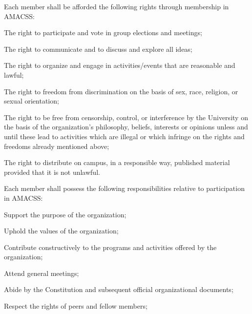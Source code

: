 \documentclass[12pt,a4paper]{article}
\begin{document}
\begin{constitutionlist}
\item Each member shall be afforded the following rights through membership in AMACSS:

\begin{constitutionlist}
\item The right to participate and vote in group elections and meetings;

\item The right to communicate and to discuss and explore all ideas;

\item The right to organize and engage in activities/events that are reasonable and lawful;

\item The right to freedom from discrimination on the basis of sex, race, religion, or sexual orientation;

\item The right to be free from censorship, control, or interference by the University on the basis of the organization's philosophy, beliefs, interests or opinions unless and until these lead to activities which are illegal or which infringe on the rights and freedoms already mentioned above;

\item The right to distribute on campus, in a responsible way, published material provided that it is not unlawful.
\end{constitutionlist}

\item Each member shall possess the following responsibilities relative to participation in AMACSS:

\begin{constitutionlist}
\item Support the purpose of the organization;

\item Uphold the values of the organization;

\item Contribute constructively to the programs and activities offered by the organization;

\item Attend general meetings;

\item Abide by the Constitution and subsequent official organizational documents;

\item Respect the rights of peers and fellow members;


\end{constitutionlist}
\end{constitutionlist}
\end{document}
